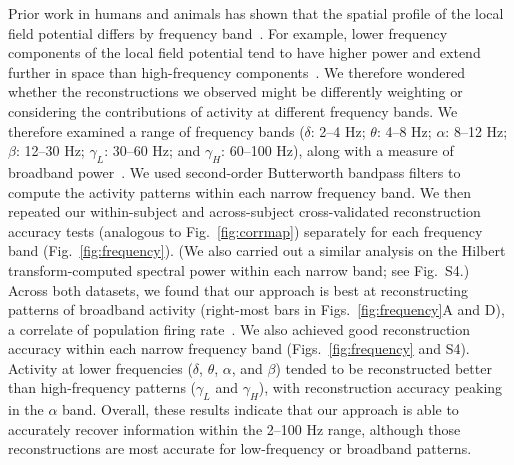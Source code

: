 \documentclass[11pt]{article}
\newcommand{\freqpower}{S4}
\begin{document}
Prior work in humans and animals has shown that the spatial profile of the local
field potential differs by frequency band~\citep[e.g., with respect to volume
conductance properties and contribution to the local field
potential;][]{BuzsEtal12, FrieEtal07, CronEtal11}.  For example, lower frequency
components of the local field potential tend to have higher power and extend
further in space than high-frequency components~\citep[e.g., ][]{MillEtal07,
MannEtal09}.  We therefore wondered whether the reconstructions we observed
might be differently weighting or considering the contributions of activity at
different frequency bands.  We therefore examined a range of frequency bands
($\delta$: 2--4 Hz; $\theta$: 4--8 Hz; $\alpha$: 8--12 Hz; $\beta$: 12--30 Hz;
$\gamma_L$: 30--60 Hz; and $\gamma_H$: 60--100 Hz), along with a measure of
broadband power~\citep[defined as the mean height of a linear robust regression
fit in log-log space to the order 4 Morelet wavelet-computed power spectrum at
50 log-spaced frequencies from from 2--100 Hz;][]{MannEtal09}.  We used
second-order Butterworth bandpass filters to compute the activity patterns
within each narrow frequency band.  We then repeated our within-subject and
across-subject cross-validated reconstruction accuracy tests (analogous to
Fig.~\ref{fig:corrmap}) separately for each frequency band
(Fig.~\ref{fig:frequency}).  (We also carried out a similar analysis on the
Hilbert transform-computed spectral power within each narrow band; see
Fig.~\freqpower.)  Across both datasets, we found that our approach is best at
reconstructing patterns of broadband activity (right-most bars in
Figs.~\ref{fig:frequency}A and D), a correlate of population firing
rate~\citep{MannEtal09}.  We also achieved good reconstruction accuracy within
each narrow frequency band (Figs.~\ref{fig:frequency} and \freqpower).  Activity
at lower frequencies ($\delta$, $\theta$, $\alpha$, and $\beta$) tended to be
reconstructed better than high-frequency patterns ($\gamma_L$ and $\gamma_H$),
with reconstruction accuracy peaking in the $\alpha$ band.  Overall, these
results indicate that our approach is able to accurately recover information
within the 2--100 Hz range, although those reconstructions are most accurate for
low-frequency or broadband patterns.
\end{document}
